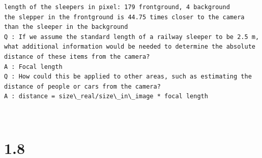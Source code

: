 \documentclass[11pt]{article}
\begin{document}
    \begin{Verbatim}[commandchars=\\\{\}]
length of the sleepers in pixel: 179 frontground, 4 background
the slepper in the frontground is 44.75 times closer to the camera than the sleeper in the background
Q : If we assume the standard length of a railway sleeper to be 2.5 m, what additional information would be needed to determine the absolute distance of these items from the camera?
A : Focal length
Q : How could this be applied to other areas, such as estimating the distance of people or cars from the camera?
A : distance = size\_real/size\_in\_image * focal length

    \end{Verbatim}

    \begin{center}
    \end{center}
    { \hspace*{\fill} \\}
    
    \hypertarget{section}{%
\section{1.8}\label{section}}
\end{document}
